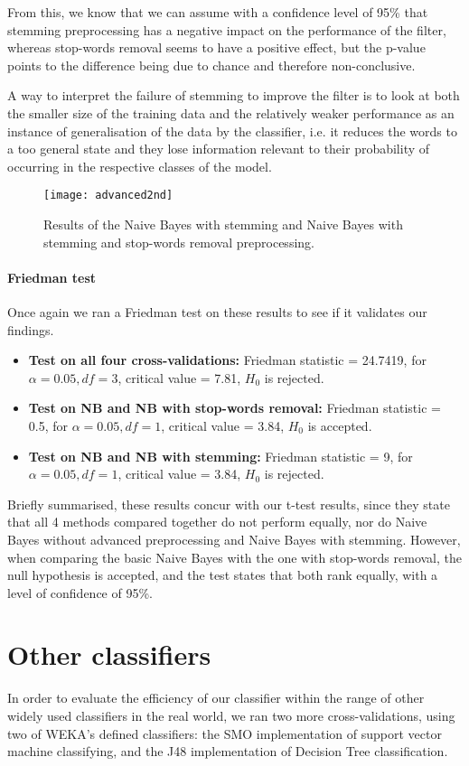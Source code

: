 \documentclass[12pt,a4paper]{report}
\begin{document}
From this, we know that we can assume with a confidence level of 95\% that stemming preprocessing has a negative impact on the performance of the filter, whereas stop-words removal seems to have a positive effect, but the p-value points to the difference being due to chance and therefore non-conclusive.

A way to interpret the failure of stemming to improve the filter is to look at both the smaller size of the training data and the relatively weaker performance as an instance of generalisation of the data by the classifier, i.e. it reduces the words to a too general state and they lose information relevant to their probability of occurring in the respective classes of the model.

\begin{figure}
\texttt{[image: advanced2nd]}
\centering
\caption{Results of the Naive Bayes with stemming and Naive Bayes with stemming and stop-words removal preprocessing.}
\end{figure}

\paragraph*{Friedman test}
Once again we ran a Friedman test on these results to see if it validates our findings.
\begin{itemize}
\item \textbf{Test on all four cross-validations:} Friedman statistic = 24.7419, for $ \alpha = 0.05, df = 3 $, critical value = 7.81, $ H_0 $ is rejected.
\item \textbf{Test on NB and NB with stop-words removal:} Friedman statistic = 0.5, for $ \alpha = 0.05, df = 1 $, critical value = 3.84, $ H_0 $ is accepted.
\item \textbf{Test on NB and NB with stemming:} Friedman statistic = 9, for $ \alpha = 0.05, df = 1 $, critical value = 3.84, $ H_0 $ is rejected.
\end{itemize}

Briefly summarised, these results concur with our t-test results, since they state that all 4 methods compared together do not perform equally, nor do Naive Bayes without advanced preprocessing and Naive Bayes with stemming. However, when comparing the basic Naive Bayes with the one with stop-words removal, the null hypothesis is accepted, and the test states that both rank equally, with a level of confidence of 95\%.

\section{Other classifiers}
In order to evaluate the efficiency of our classifier within the range of other widely used classifiers in the real world, we ran two more cross-validations, using two of WEKA's defined classifiers: the SMO implementation of support vector machine classifying, and the J48 implementation of Decision Tree classification.
\end{document}
